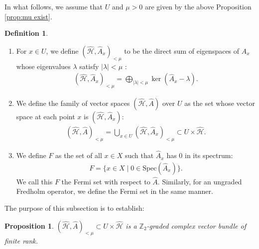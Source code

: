 \documentclass{amsart}
\newtheorem{prop}[thm]{Proposition}
\theoremstyle{definition}
\newtheorem{dfn}[thm]{Definition}
\theoremstyle{remark}
\begin{document}
In what follows, we assume that $U$ and $\mu>0$ are given by the above Proposition \ref{prop:mu exist}.
\begin{dfn}
\begin{enumerate}
\item For $x\in U$, we define $(\mathcal{\hat{H}}, \hat{A}_x)_{<\mu}$ to be the direct sum of eigenspaces of $\hat{A}_x$ whose eigenvalues $\lambda$ satisfy $|\lambda|<\mu$ :
\begin{align*}
(\mathcal{\hat{H}}, \hat{A}_x)_{<\mu}=\bigoplus_{|\lambda|<\mu}\ker(\hat{A}_{x}-\lambda).
 \end{align*}
\item We define the family of vector spaces $(\hat{\mathcal{H}}, \hat{A})$ over $U$ as the set whose vector space at each point $x$ is $(\hat{\mathcal{H}}, \hat{A}_x)$:
\begin{align*}
(\mathcal{\hat{H}}, \hat{A})_{<\mu}=\bigcup_{x \in U}(\mathcal{\hat{H}}, \hat{A}_x)_{<\mu}\subset U\times \mathcal{\hat{H}}.
\end{align*}
\item We define $F$ as the set of all $x \in X$ such that $\hat{A}_x$ has $0$ in its spectrum:
\begin{align*}
F = \{ x \in X \mid 0 \in \mathrm{Spec}(\hat{A}_{x}) \}.
\end{align*}
We call this $F$ the Fermi set with respect to $\hat{A}$. Similarly, for an ungraded Fredholm operator, we define the Fermi set in the same manner.
\end{enumerate}
\end{dfn}

 The purpose of this subsection is to establish:
 
\begin{prop}\label{prop:apporoximation vector bundle}
$(\hat{\mathcal{H}}, \hat{A})_{<\mu}\subset U\times \hat{\mathcal{H}}$ is a $\mathbb{Z}_2$-graded complex vector bundle of finite rank.
 \end{prop}
 
\end{document}

